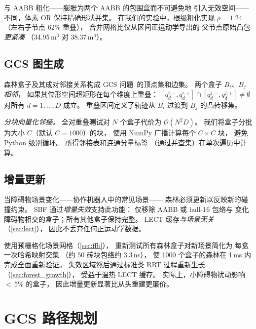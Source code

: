 \documentclass[journal]{IEEEtran}
\newcommand{\calO}{\mathcal{O}}
\begin{document}
与 AABB 粗化——膨胀为两个 AABB 的包围盒而不可避免地
引入无效空间——不同，体素 OR 保持精确形状并集。
在我们的实验中，根级粗化实现
$\rho{=}1.24$（左右子节点 62\% 重叠），
合并网格比仅从区间正运动学导出的
父节点原始凸包\emph{更紧凑}
（34.95\,m$^3$ 对 38.37\,m$^3$）。

\subsection{GCS 图生成}\label{sec:gcs_graph}

森林盒子及其成对邻接关系构成
GCS 问题~\cite{marcucci2024motion}的顶点集和边集。
两个盒子 $B_i$、$B_j$ \emph{相邻}，
如果其位形空间超矩形在每个维度上重叠：
$[q_d^{i,-}, q_d^{i,+}] \cap [q_d^{j,-}, q_d^{j,+}] \neq \emptyset$
对所有 $d = 1,\ldots,D$ 成立。
重叠区间定义了轨迹从 $B_i$ 过渡到 $B_j$ 的凸转移集。

\emph{分块向量化邻接。}
全对重叠测试对 $N$ 个盒子代价为 $\calO(N^2 D)$。
我们将盒子分批为大小 $C$（默认 $C{=}1000$）的块，
使用 NumPy 广播计算每个 $C{\times}C$ 块，
避免 Python 级别循环。
所得邻接表和连通分量标签
（通过并查集）在单次遍历中计算。

\subsection{增量更新}\label{sec:incremental}

当障碍物场景变化——协作机器人中的常见场景——
森林必须更新以反映新的碰撞约束。
SBF 通过\emph{增量失效}支持此功能：
仅移除 AABB 或 hull-16 包络与
变化障碍物相交的盒子；所有其他盒子保持完整。
LECT 缓存\emph{与场景无关}（\cref{sec:lect}），
因此不丢弃任何正运动学数据。

使用预栅格化场景网格（\cref{sec:ffb}），
重新测试所有森林盒子对新场景简化为
每盒一次哈希映射交集
（约 50 砖块包络约 3.3\,ns），
使 1000 个盒子的森林在 1\,ms 内完成全面重新验证。
失效区域然后通过标准类 RRT 过程重新生长
（\cref{sec:forest_growth}），
受益于温热 LECT 缓存。
实际上，小障碍物扰动影响 $<$\,5\% 的盒子，
因此增量更新显著比从头重建更廉价。

\section{GCS 路径规划}\label{sec:planner}

\end{document}
